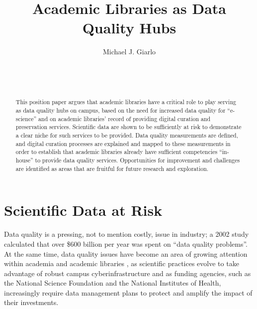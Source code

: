 \documentclass{acm_proc_article-sp}
\begin{document}
\title{Academic Libraries as Data Quality Hubs}

 \author{
  \alignauthor Michael J. Giarlo\\
  \\
  \\
  \\
   }
\maketitle

\begin{abstract}
  This position paper argues that academic libraries have a critical
  role to play serving as data quality hubs on campus, based on the
  need for increased data quality for ``e-science'' and on academic
  libraries' record of providing digital curation and preservation
  services. Scientific data are shown to be sufficiently at risk to
  demonstrate a clear niche for such services to be provided. Data
  quality measurements are defined, and digital curation processes are
  explained and mapped to these measurements in order to establish
  that academic libraries already have sufficient competencies
  ``in-house'' to provide data quality services. Opportunities for
  improvement and challenges are identified as areas that are fruitful
  for future research and exploration.
\end{abstract}



\section{Scientific Data at Risk}
Data quality is a pressing, not to mention costly, issue in industry;
a 2002 study\cite{russom:case} calculated that over \$600 billion per
year was spent on ``data quality problems''\cite{eckerson:bottomline}.
At the same time, data quality issues have become an area of growing
attention within academia and academic libraries
\cite{heidorn:libraries,arl:stewardship,ogburn:imperative,jisc:deluge},
as scientific practices evolve to take advantage of robust campus
cyberinfrastructure and as funding agencies, such as the National
Science Foundation and the National Institutes of Health, increasingly
require data management plans to protect and amplify the impact of
their investments.
\end{document}
